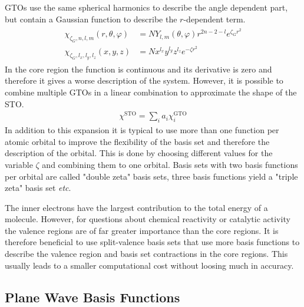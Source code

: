 \acp{GTO} use the same spherical harmonics to describe the angle dependent
part, but contain a Gaussian function to describe the $r$-dependent term.
%
\begin{align}
    \begin{aligned}
    \chi_{\zeta_G,n,l,m}(r,\theta,\varphi) &= NY_{l,m}(\theta,\varphi)r^{2n-2-l}e^{\zeta_Gr^2}\\
    \chi_{\zeta_G,l_x,l_y,l_z}(x,y,z) &= N x^{l_x}y^{l_y}z^{l_z}e^{-\zeta r^2}
    \end{aligned}
\end{align}
%
In the core region the function is continuous and its derivative is zero and
therefore it gives a worse description of the system. However, it is possible
to combine multiple \acp{GTO} in a linear combination to approximate the shape
of the \ac{STO}.
%
\begin{align}
    \chi^\text{STO} = \sum_ia_i\chi_i^\text{GTO}
\end{align}
%
In addition to this expansion it is typical to use more than one
function per atomic orbital to improve the flexibility of the basis set and
therefore the description of the orbital. This is done by choosing different
values for the variable $\zeta$ and combining them to one orbital. Basis sets
with two basis functions per orbital are called "double zeta" basis sets, three
basis functions yield a "triple zeta" basis set \textit{etc}.

The inner electrons have the largest contribution to the total energy of a
molecule. However, for questions about chemical reactivity or catalytic
activity the valence regions are of far greater importance than the core
regions. It is therefore beneficial to use split-valence basis sets that use
more basis functions to describe the valence region and basis set contractions
in the core regions. This usually leads to a smaller computational cost without
loosing much in accuracy. 

\subsection{Plane Wave Basis Functions}
\label{sec:PlaneWaveBasisFunctions}

